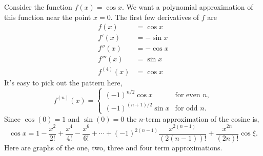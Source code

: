 

\begin{example}
{\rm
  Consider the function $f(x) = \cos x$.  We want a polynomial approximation of
  this function near the point $x = 0$. The first few derivatives of $f$ are
  \begin{align*}
    f(x) &= \cos x \\
    f'(x) &= - \sin x \\
    f''(x) &= - \cos x \\
    f'''(x) &= \sin x \\
    f^{(4)}(x) &= \cos x
  \end{align*} 
  It's easy to pick out the pattern here,
  \[
  f^{(n)}(x) = 
  \begin{cases}
    (-1)^{n/2} \cos x &\text{for even } n, \\
    (-1)^{(n+1)/2} \sin x & \text{for odd } n.
  \end{cases}
  \]
  Since $\cos(0) = 1$ and $\sin(0) = 0$ the $n$-term approximation of the
  cosine is,
  \[
  \cos x = 1 - \frac{x^2}{2!} + \frac{x^4}{4!} - \frac{x^6}{6!} + \cdots
  + (-1)^{2(n-1)} \frac{x^{2(n-1)}}{(2(n-1))!} 
  + \frac{x^{2n}}{(2n)!} \cos \xi.
  \]
  Here are graphs of the one, two, three and four term approximations.

}
\end{example}
